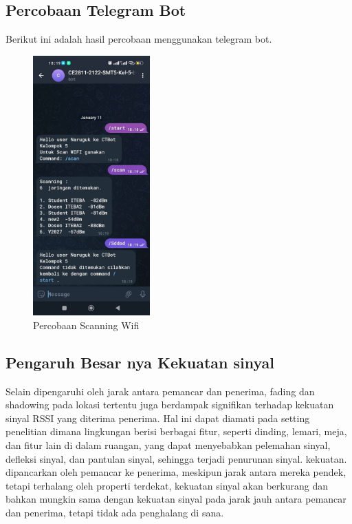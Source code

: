 \documentclass[conference]{IEEEtran}
\begin{document}
        \subsection{Percobaan Telegram Bot}
        Berikut ini adalah hasil percobaan menggunakan telegram bot.
        \begin{figure}[h]
            \centering
            \includegraphics[width=0.4\textwidth]{testing.jpeg}
            \caption{Percobaan Scanning Wifi}
        \end{figure}       
    
        \subsection{Pengaruh Besar nya Kekuatan sinyal}
Selain dipengaruhi oleh jarak antara pemancar dan penerima, fading dan shadowing pada lokasi tertentu juga berdampak signifikan terhadap kekuatan sinyal RSSI yang diterima penerima. Hal ini dapat diamati pada setting penelitian dimana lingkungan berisi berbagai fitur, seperti dinding, lemari, meja, dan fitur lain di dalam ruangan, yang dapat menyebabkan pelemahan sinyal, defleksi sinyal, dan pantulan sinyal, sehingga terjadi penurunan sinyal. kekuatan. dipancarkan oleh pemancar ke penerima, meskipun jarak antara mereka pendek, tetapi terhalang oleh properti terdekat, kekuatan sinyal akan berkurang dan bahkan mungkin sama dengan kekuatan sinyal pada jarak jauh antara pemancar dan penerima, tetapi tidak ada penghalang di sana.
\end{document}
